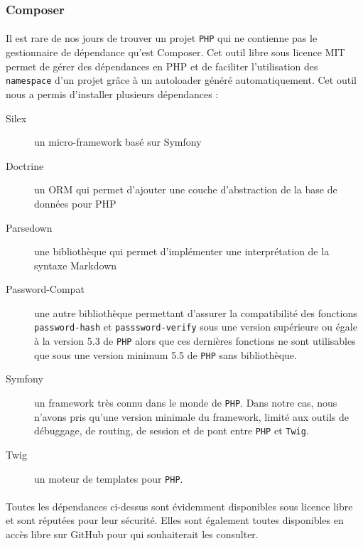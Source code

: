 \documentclass[12pt]{article}
\begin{document}
        
        \subsubsection{Composer}
            \paragraph{}Il est rare de nos jours de trouver un projet \texttt{PHP} qui ne contienne pas le gestionnaire de dépendance qu'est Composer. Cet outil libre sous licence MIT permet de gérer des dépendances en PHP et de faciliter l'utilisation des \texttt{namespace} d'un projet grâce à un autoloader généré automatiquement. Cet outil nous a permis d'installer plusieurs dépendances :

            \begin{description}
                \item[Silex] un micro-framework basé sur Symfony
                \item[Doctrine] un ORM qui permet d'ajouter une couche d'abstraction de la base de données pour PHP
                \item[Parsedown] une bibliothèque qui permet d'implémenter une interprétation de la syntaxe Markdown
                \item[Password-Compat] une autre bibliothèque permettant d'assurer la compatibilité des fonctions \texttt{password-hash} et \texttt{passsword-verify} sous une version supérieure ou égale à la version 5.3 de \texttt{PHP} alors que ces dernières fonctions ne sont utilisables que sous une version minimum 5.5 de \texttt{PHP} sans bibliothèque.
                \item[Symfony] un framework très connu dans le monde de \texttt{PHP}. Dans notre cas, nous n'avons pris qu'une version minimale du framework, limité aux outils de débuggage, de routing, de session et de pont entre \texttt{PHP} et \texttt{Twig}.
                \item[Twig] un moteur de templates pour \texttt{PHP}.
            \end{description}
        
            \paragraph{} Toutes les dépendances ci-dessus sont évidemment disponibles sous licence libre et sont réputées pour leur sécurité. Elles sont également toutes disponibles en accès libre sur GitHub pour qui souhaiterait les consulter.
\end{document}
